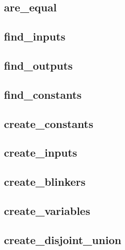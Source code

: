 \documentclass[letterpaper,10pt,english]{sphinxmanual}
\begin{document}
\subsection{are\_equal}
\label{PrimeImplicants:id2}\label{PrimeImplicants:are-equal}

\subsection{find\_inputs}
\label{PrimeImplicants:id3}\label{PrimeImplicants:find-inputs}

\subsection{find\_outputs}
\label{PrimeImplicants:id4}\label{PrimeImplicants:find-outputs}

\subsection{find\_constants}
\label{PrimeImplicants:id5}\label{PrimeImplicants:find-constants}

\subsection{create\_constants}
\label{PrimeImplicants:id6}\label{PrimeImplicants:create-constants}

\subsection{create\_inputs}
\label{PrimeImplicants:id7}\label{PrimeImplicants:create-inputs}

\subsection{create\_blinkers}
\label{PrimeImplicants:create-blinkers}\label{PrimeImplicants:id8}

\subsection{create\_variables}
\label{PrimeImplicants:create-variables}\label{PrimeImplicants:id9}

\subsection{create\_disjoint\_union}
\label{PrimeImplicants:id10}\label{PrimeImplicants:create-disjoint-union}
\end{document}
